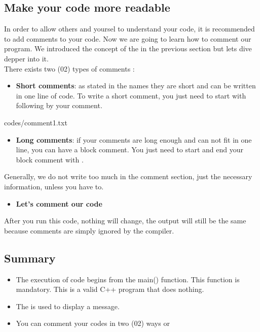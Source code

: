 \documentclass[11pt, a4paper]{article}
\begin{document}
\subsection{Make your code more readable}
In order to allow others and yoursel to understand your code, it is recommended to add
comments to your code. Now we are going to learn how to comment our program. We introduced
the concept of the in the previous section but lets dive depper into it.\\
There exists two (02) types of comments :
\begin{itemize}
\item {\textbf{Short comments}}: as stated in the names they are short and can be written
    in one line of code. To write a short comment, you just need to start with \fbox{\color{green!60!black}//}
    following by your comment.
\end{itemize}

{codes/comment1.txt}


\begin{itemize}
\item {\textbf{Long comments}}: if your comments are long enough and can not fit in one line,
    you can have a block comment. You just need to start and end your block comment
    with \fbox{/*}.
\end{itemize}



\noindent Generally, we do not write too much in the comment section, just the necessary
information, unless you have to.

\begin{itemize}
    \item {\textbf{Let's comment our code}}
\end{itemize}


\noindent After you run this code, nothing will change, the output will still be the same
because comments are simply ignored by the compiler.

\subsection{Summary}
\begin{itemize}
    \item The execution of code begins from the main() function. This function is mandatory.
    This is a valid C++ program that does nothing.
    \item The  is used to display a message.
    \item You can comment your codes in two (02) ways
     or 
\end{itemize}
\end{document}
